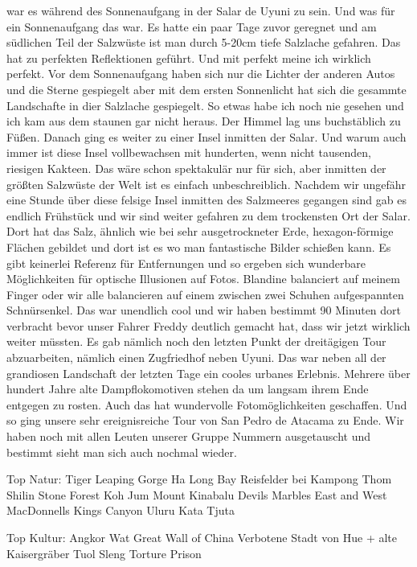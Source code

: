 \documentclass[11pt]{book}
\begin{document}
war es während des Sonnenaufgang in der Salar de Uyuni zu sein. Und was für ein Sonnenaufgang das war. Es hatte ein paar Tage zuvor geregnet und am 
südlichen Teil der Salzwüste ist man durch 5-20cm tiefe Salzlache gefahren. Das hat zu perfekten Reflektionen geführt. Und mit perfekt meine ich wirklich 
perfekt. Vor dem Sonnenaufgang haben sich nur die Lichter der anderen Autos und die Sterne gespiegelt aber mit dem ersten Sonnenlicht hat sich die 
gesammte Landschafte in dier Salzlache gespiegelt. So etwas habe ich noch nie gesehen und ich kam aus dem staunen gar nicht heraus. Der Himmel lag uns 
buchstäblich zu Füßen. Danach ging es weiter zu einer Insel inmitten der Salar. Und warum auch immer ist diese Insel vollbewachsen mit hunderten, wenn 
nicht tausenden, riesigen Kakteen. Das wäre schon spektakulär nur für sich, aber inmitten der größten Salzwüste der Welt ist es einfach unbeschreiblich. 
Nachdem wir ungefähr eine Stunde über diese felsige Insel inmitten des Salzmeeres gegangen sind gab es endlich Frühstück und wir sind weiter gefahren 
zu dem trockensten Ort der Salar. Dort hat das Salz, ähnlich wie bei sehr ausgetrockneter Erde, hexagon-förmige Flächen gebildet und dort ist es 
wo man fantastische Bilder schießen kann. Es gibt keinerlei Referenz für Entfernungen und so ergeben sich wunderbare Möglichkeiten für optische 
Illusionen auf Fotos. Blandine balanciert auf meinem Finger oder wir alle balancieren auf einem zwischen zwei Schuhen aufgespannten Schnürsenkel. 
Das war unendlich cool und wir haben bestimmt 90 Minuten dort verbracht bevor unser Fahrer Freddy deutlich gemacht hat, dass wir jetzt wirklich weiter 
müssten. Es gab nämlich noch den letzten Punkt der dreitägigen Tour abzuarbeiten, nämlich einen Zugfriedhof neben Uyuni. Das war neben all der grandiosen 
Landschaft der letzten Tage ein cooles urbanes Erlebnis. Mehrere über hundert Jahre alte Dampflokomotiven stehen da um langsam ihrem Ende entgegen zu 
rosten. Auch das hat wundervolle Fotomöglichkeiten geschaffen. Und so ging unsere sehr ereignisreiche Tour von San Pedro de Atacama zu Ende. Wir haben noch 
mit allen Leuten unserer Gruppe Nummern ausgetauscht und bestimmt sieht man sich auch nochmal wieder.






Top Natur:
Tiger Leaping Gorge
Ha Long Bay
Reisfelder bei Kampong Thom
Shilin Stone Forest
Koh Jum
Mount Kinabalu
Devils Marbles
East and West MacDonnells
Kings Canyon
Uluru
Kata Tjuta


Top Kultur:
Angkor Wat
Great Wall of China
Verbotene Stadt von Hue + alte Kaisergräber 
Tuol Sleng Torture Prison
\end{document}
